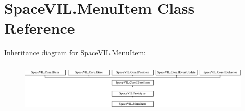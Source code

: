 \hypertarget{class_space_v_i_l_1_1_menu_item}{}\section{Space\+V\+I\+L.\+Menu\+Item Class Reference}
\label{class_space_v_i_l_1_1_menu_item}
Inheritance diagram for Space\+V\+I\+L.\+Menu\+Item\+:\begin{figure}[H]
\begin{center}
\leavevmode
\includegraphics[height=2.421622cm]{class_space_v_i_l_1_1_menu_item}
\end{center}
\end{figure}
